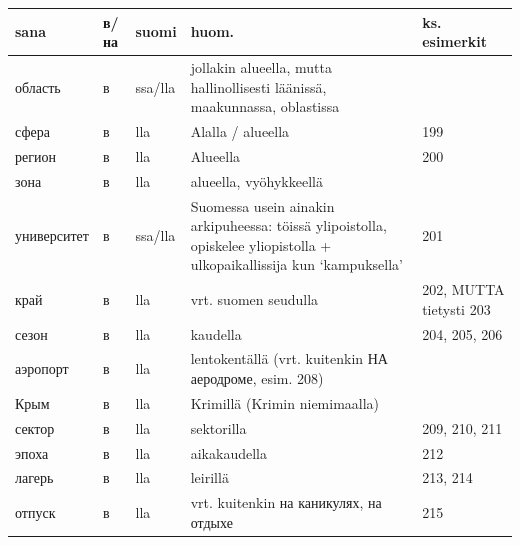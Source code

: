 \documentclass[]{scrartcl}
\begin{document}
\begin{longtable}[c]{@{}lllll@{}}
\toprule
sana & в/на & suomi & huom. & ks. esimerkit\tabularnewline
\midrule
\endhead
область & в & ssa/lla & jollakin alueella, mutta hallinollisesti
läänissä, maakunnassa, oblastissa &\tabularnewline
сфера & в & lla & Alalla / alueella & 199\tabularnewline
регион & в & lla & Alueella & 200\tabularnewline
зона & в & lla & alueella, vyöhykkeellä &\tabularnewline
университет & в & ssa/lla & Suomessa usein ainakin arkipuheessa: töissä
ylipoistolla, opiskelee yliopistolla + ulkopaikallissija kun
`kampuksella' & 201\tabularnewline
край & в & lla & vrt. suomen seudulla & 202, MUTTA tietysti
203\tabularnewline
сезон & в & lla & kaudella & 204, 205, 206\tabularnewline
аэропорт & в & lla & lentokentällä (vrt. kuitenkin НА аеродроме, esim.
208) &\tabularnewline
Крым & в & lla & Krimillä (Krimin niemimaalla) &\tabularnewline
сектор & в & lla & sektorilla & 209, 210, 211\tabularnewline
эпоха & в & lla & aikakaudella & 212\tabularnewline
лагерь & в & lla & leirillä & 213, 214\tabularnewline
отпуск & в & lla & vrt. kuitenkin на каникулях, на отдыхе &
215\tabularnewline
\bottomrule
\end{longtable}
\end{document}
